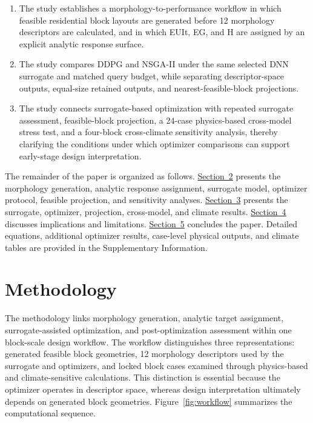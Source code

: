 \documentclass[final,3p,times,numbers,sort&compress]{elsarticle}
\newcommand{\secref}[2]{\hyperref[#1]{\textcolor{sectionlinkblue}{\rmfamily Section~#2}}}
\def\textcolor#1#2{#2}%
\def\rev#1{#1}%
\newif\ifshowrevision
\newcommand{\rev}[1]{%
  \ifshowrevision{\textcolor{revisionblue}{#1}}\else#1\fi%
}
\newenvironment{revblock}{%
  \ifshowrevision\color{revisionblue}\fi%
}{}
\begin{document}
\begin{revblock}
\begin{enumerate}[leftmargin=1.6em]
\item The study establishes a morphology-to-performance workflow in which feasible residential block layouts are generated before 12 morphology descriptors are calculated, and in which EUIt, EG, and H are assigned by an explicit analytic response surface.
\item The study compares DDPG and NSGA-II under the same selected DNN surrogate and matched query budget, while separating descriptor-space outputs, equal-size retained outputs, and nearest-feasible-block projections.
\item The study connects surrogate-based optimization with repeated surrogate assessment, feasible-block projection, a 24-case physics-based cross-model stress test, and a four-block cross-climate sensitivity analysis, thereby clarifying the conditions under which optimizer comparisons can support early-stage design interpretation.
\end{enumerate}

The remainder of the paper is organized as follows. \secref{sec:methodology}{2} presents the morphology generation, analytic response assignment, surrogate model, optimizer protocol, feasible projection, and sensitivity analyses. \secref{sec:results}{3} presents the surrogate, optimizer, projection, cross-model, and climate results. \secref{sec:discussion}{4} discusses implications and limitations. \secref{sec:conclusions}{5} concludes the paper. Detailed equations, additional optimizer results, case-level physical outputs, and climate tables are provided in the Supplementary Information.
\end{revblock}

\section{Methodology}
\label{sec:methodology}

\rev{The methodology links morphology generation, analytic target assignment, surrogate-assisted optimization, and post-optimization assessment within one block-scale design workflow. The workflow distinguishes three representations: generated feasible block geometries, 12 morphology descriptors used by the surrogate and optimizers, and locked block cases examined through physics-based and climate-sensitive calculations. This distinction is essential because the optimizer operates in descriptor space, whereas design interpretation ultimately depends on generated block geometries. Figure~\ref{fig:workflow} summarizes the computational sequence.}
\end{document}
